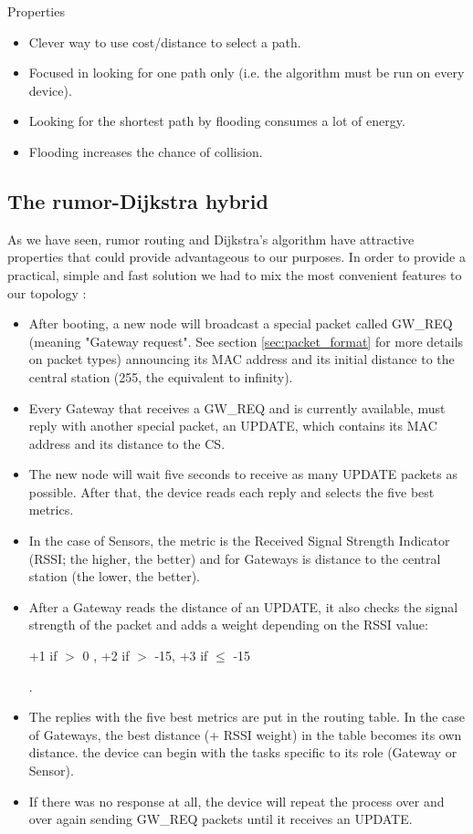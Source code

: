 \noindent Properties
\begin{itemize}[noitemsep]
	\item Clever way to use cost/distance to select a path.
	\item Focused in looking for one path only (i.e. the algorithm must be run on every device).
	\item Looking for the shortest path by flooding consumes a lot of energy.
	\item Flooding increases the chance of collision.
\end{itemize}

\subsection{The rumor-Dijkstra hybrid}
\label{sec:hybrid}
As we have seen, rumor routing and Dijkstra's algorithm have attractive properties that could provide advantageous to our purposes. 
In order to provide a practical, simple and fast solution we had to mix the most convenient features to our topology :

\begin{itemize}[noitemsep]
	\item After booting, a new node will broadcast a special packet called GW\_REQ (meaning "Gateway request". See section \ref{sec:packet_format} for more details on packet types) announcing its MAC address and its initial distance to the central station (255, the equivalent to infinity).
	\item Every Gateway that receives a GW\_REQ and is currently available, must reply with another special packet, an UPDATE, which contains its MAC address and its distance to the CS.
	\item The new node will wait five seconds to receive as many UPDATE packets as possible. After that, the device reads each reply and selects the five best metrics. 
	\item In the case of Sensors, the metric is the Received Signal Strength Indicator (RSSI; the higher, the better) and for Gateways is distance to the central station (the lower, the better).
	\item After a Gateway reads the distance of an UPDATE, it also checks the signal strength of the packet and adds a weight depending on the RSSI value:\\
			\centerline{+1 if \(>\) 0 , +2 if \(>\) -15, +3 if \(\leq\) -15}. 
	\item The replies with the five best metrics are put in the routing table. In the case of Gateways, the best distance (+ RSSI weight) in the table becomes its own distance.
	the device can begin with the tasks specific to its role (Gateway or Sensor).
	\item If there was no response at all, the device will repeat the process over and over again sending GW\_REQ packets until it receives an UPDATE.
\end{itemize}

